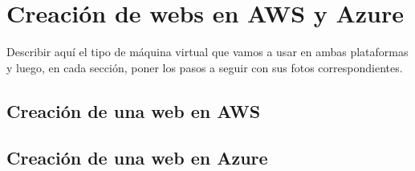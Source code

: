\chapter{Creación de webs en AWS y Azure}
Describir aquí el tipo de máquina virtual que vamos a usar en ambas plataformas y luego, en cada sección, poner los pasos a seguir con sus fotos correspondientes.
\section{Creación de una web en AWS}


\section{Creación de una web en Azure}